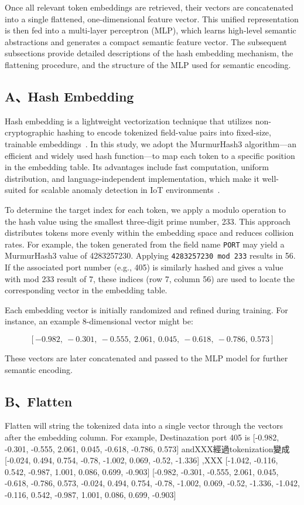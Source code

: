 \begin{ZhChapter}
Once all relevant token embeddings are retrieved, their vectors are concatenated into a single flattened, one-dimensional feature vector. This unified representation is then fed into a multi-layer perceptron (MLP), which learns high-level semantic abstractions and generates a compact semantic feature vector. The subsequent subsections provide detailed descriptions of the hash embedding mechanism, the flattening procedure, and the structure of the MLP used for semantic encoding.

\subsection*{A、Hash Embedding}
Hash embedding is a lightweight vectorization technique that utilizes non-cryptographic hashing to encode tokenized field-value pairs into fixed-size, trainable embeddings~\cite{weinberger2009feature}. In this study, we adopt the MurmurHash3 algorithm—an efficient and widely used hash function—to map each token to a specific position in the embedding table. Its advantages include fast computation, uniform distribution, and language-independent implementation, which make it well-suited for scalable anomaly detection in IoT environments~\cite{appleby2011murmurhash}.

To determine the target index for each token, we apply a modulo operation to the hash value using the smallest three-digit prime number, 233. This approach distributes tokens more evenly within the embedding space and reduces collision rates. For example, the token generated from the field name \texttt{PORT} may yield a MurmurHash3 value of 4283257230. Applying \texttt{4283257230 mod 233} results in 56. If the associated port number (e.g., 405) is similarly hashed and gives a value with mod 233 result of 7, these indices (row 7, column 56) are used to locate the corresponding vector in the embedding table.

Each embedding vector is initially randomized and refined during training. For instance, an example 8-dimensional vector might be:



\[
[-0.982,\ -0.301,\ -0.555,\ 2.061,\ 0.045,\ -0.618,\ -0.786,\ 0.573]
\]



These vectors are later concatenated and passed to the MLP model for further semantic encoding.




\subsection*{B、Flatten}
Flatten will string the tokenized data into a single vector through the vectors after the embedding column. For example, Destinazation port 405 is [-0.982, -0.301, -0.555, 2.061, 0.045, -0.618, -0.786, 0.573] andXXX經過tokenization變成[-0.024, 0.494, 0.754, -0.78, -1.002, 0.069, -0.52, -1.336] ,XXX [-1.042, -0.116, 0.542, -0.987, 1.001, 0.086, 0.699, -0.903]
[-0.982, -0.301, -0.555, 2.061, 0.045, -0.618, -0.786, 0.573, -0.024, 0.494, 0.754, -0.78, -1.002, 0.069, -0.52, -1.336, -1.042, -0.116, 0.542, -0.987, 1.001, 0.086, 0.699, -0.903]



\end{ZhChapter}
